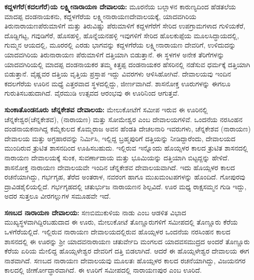 \textbf{ಕದ್ದಳಗೆರೆ(ಕದಲಗೆರೆ)ಯ ಲಕ್ಷ್ಮೀನಾರಾಯಣ ದೇವಾಲಯ:} ಮೂರನೆಯ ಬಲ್ಲಾಳನ ಕಾರುಣ್ಯದಿಂದ ಹೆಡತಲೆಯ ಮಾದಪ್ಪ ದಂಡನಾಯಕನು, ಕದ್ದಳಗೆರೆಯ ಲಕ್ಷ್ಮೀನಾರಾಯಣದೇವಾಲಯಕ್ಕೆ, ಯಾದವಗಿರಿಯ ತಿರುನಾರಾಯಣಪೆರುಮಾಳಿಗೆ ಮತ್ತು ತಿರುವಿಷ್ಣು ಪೆರುಮಾಳಿಗೆ ಕದ್ದಳಗೆರೆಗೆ ಸೇರಿದ ಉಪಗ್ರಾಮಗಳಾದ ಗುಳಿಯಕೆರೆ, ದೊಡ್ಡಿಗಟ್ಟ, ಗವುಡಿಗೆರೆ, ಹೊಸಹಳ್ಳಿ, ಹೊನ್ನೆಯನಹಳ್ಳಿ ಇವುಗಳಿಗೆ ಸೇರಿದ ಹೊಲಕುಪ್ಪೆಯ ಮೂಲಸಿದ್ಧಾಯದಲ್ಲಿ, ಗುಮ್ಮನ ಆಯದಲ್ಲಿ, ಮೂರರಲ್ಲಿ ಎರಡು ಭಾಗವನ್ನು ಕದ್ದಳಗೆರೆಯ ಲಕ್ಷ್ಮೀನಾರಾಯಣ ದೇವರಿಗೆ, ಉಳಿದುದನ್ನು ಯಾದವಗಿರಿಯ ತಿರುನಾರಾಯಣ ಪೆರುಮಾಳಿಗೆ ದತ್ತಿಯಾಗಿ ಬಿಡುತ್ತಾನೆ. ಈ ಸ್ಥಳಗಳ ಅನೇಕ ತೆರಿಗೆಗಳನ್ನು ಯಾದವಗಿರಿಯಲ್ಲಿ ಮಾದಪ್ಪ ದಂಡನಾಯಕರ ತಮ್ಮ ಕಿತ್ತಪ್ಪ ದಂಡನಾಯಕರ ಹೆಸರಿನಲ್ಲಿ ನಡೆಸುವ ಧರ್ಮಕ್ಕೆ ದತ್ತಿಯಾಗಿ ಬಿಡುತ್ತಾನೆ. ವೈಷ್ಣವರ ದತ್ತಿಯ ವೃತ್ತಿಯ ಪ್ರಸ್ತಾಪ ಇದ್ದು ವಿವರಗಳು ಆಳಿಸಿಹೋಗಿವೆ. ದೇವಾಲಯವು ಇಂದಿನ ಕದಲಗೆರೆಯ ಊರಿನ ಮಧ್ಯೆ ಎತ್ತರವಾದ ಸ್ಥಳದಲ್ಲಿದ್ದು, ಜೀರ್ಣವಾಗಿದೆ. ಶಾಸನೋಕ್ತ ಊರುಗಳನ್ನು ಈಗಲೂ ಗುರುತಿಸಬಹುದಾಗಿದೆ. ವೈರಮುಡಿ ಉತ್ಸವದ ಆರಂಭವು ಈ ಊರಿನಿಂದ ಆಗುತ್ತವೆ.

\textbf{ಸುಂಕಾತೊಂಡನೂರು ಚೆನ್ನಕೇಶವ ದೇವಾಲಯ:} ಮೇಲುಕೋಟೆಗೆ ಸಮೀಪ ಇರುವ ಈ ಊರಿನಲ್ಲಿ ಚೆನ್ನಕೇಶ್ವರ\break (ಚೆನ್ನಕೇಶವ), (ನಾರಾಯಣ) ಮತ್ತು ಸೋಮೇಶ್ವರ ಎಂಬ ದೇವಾಲಯಗಳಿವೆ. ಒಂದನೆಯ ನರಸಿಂಹನ ದಂಡನಾಯಕ\-ನಾಗಿದ್ದ ಕಮ್ಮೆಕುಲದ ಕೊಮ್ಮರಾಜ ಅವನ ಹೆಂಡತಿ ದೇಚಲನಾರಿ ಇವರುಗಳು, ಚೆನ್ನಕೇಶವ (ನಾರಾಯಣ) ದೇವಾಲಯ ಮತ್ತು ಅಗ್ರಹಾರವನ್ನು ನಿರ್ಮಿಸಿ, ಇಲ್ಲಿದ್ದ ಬ್ರಹ್ಮಪುರಿಗೆ ದತ್ತಿಯನ್ನು ನೀಡಿದ್ದಾರೆಂದು, ದೇವಾಲಯದ ಮುಂದಿರುವ ತ್ರುಟಿತ ಶಾಸನದಿಂದ ಊಹಿಸಬಹುದು. ಇಲ್ಲಿರುವ ಇನ್ನೊಂದು ಹೊಯ್ಸಳರ ಕಾಲದ ತ್ರುಟಿತ ಶಾಸನದಲ್ಲಿ ನಾರಾಯಣ ದೇವಾಲಯಕ್ಕೆ ಸುಂಕ, ಸುವರ್ಣಾದಾಯ ಮತ್ತು ಭೂಮಿಯನ್ನು ದತ್ತಿಯಾಗಿ ಬಿಟ್ಟದ್ದನ್ನು ಹೇಳಿದೆ. ಶಾಸನೋಕ್ತ ನಾರಾಯಣ ದೇವಾಲಯವೇ ಇಂದಿನ ಚೆನ್ನಕೇಶವ ದೇವಾಲಯವಾಗಿದೆ. ಇದು ಹೊಯ್ಸಳರ ಕಾಲದ ರಚನೆಯಾಗಿದ್ದು, ಗರ್ಭಗೃಹ, ತೆರೆದ ಅಂತರಾಳ, ನವರಂಗ ಹಾಗೂ ಮುಖಮಂಟಪಗಳನ್ನು ಹೊಂದಿದೆ. ಗೋಪುರವು ದ್ರಾವಿಡಶೈಲಿಯಲ್ಲಿದೆ. ಗರ್ಭಗೃಹದಲ್ಲಿ ಚತುರ್ಭುಜ ನಾರಾಯಣನ ಶಿಲ್ಪವಿದೆ. ಊರ ಮಧ್ಯ ರಾಕ್ಷಸಮ್ಮನ ಗುಡಿ ಇದ್ದು, ಅದರ ಸುತ್ತಲೂ ವೀರಗಲ್ಲುಗಳ ಸಮೂಹವೇ ಇದೆ.

\textbf{ಸಣಬದ ನಾರಾಯಣ ದೇವಾಲಯ:} ಸಣಬಿಮುಕುಳಿಯ ನಾಡು ಎಂಬ ಆಡಳಿತ ವಿಭಾದ ಮುಖ್ಯಸ್ಥಳವಾಗಿದ್ದಿರ\-ಬಹುದಾದ ಈ ಊರು, ಮೇಲುಕೋಟೆ ತೊಣ್ಣೂರುಗಳಿಗೆ ಸಮೀಪದಲ್ಲಿ ತೊಣ್ಣೂರು ಕೆರೆಯ ಒಳಗೆರೆಯಲ್ಲಿದೆ. ಇಲ್ಲಿರುವ ನಾರಾಯಣ ದೇವಾಲಯದಲ್ಲಿರುವ ಹೊಯ್ಸಳರ ಒಂದನೆಯ ನರಸಿಂಹನ ಕಾಲದ ಶಾಸನದಲ್ಲಿ ಈ ಊರನ್ನು ಶ‍್ರೀ ಯಾದವನಾರಾಯಣ ಚತುರ್ವೇದಿ ಮಂಗಲದ ಯಾದವಸಮುದ್ರದ ಅಂದರೆ ತೊಣ್ಣೂರು ಕೆರೆಯ ಏರಿಯ ಮೇಲಿದ್ದ ಹೊಯ್ಸಳೇಶ್ವರ ದೇವರಿಗೆ ದತ್ತಿ ಬಿಡಲಾಗಿದೆ. ಆದರೆ ಈ ಹೊಯ್ಸಳೇಶ್ವರ ದೇವಾಲಯ ಈಗ ನಾಶವಾಗಿದೆ. ಸಣಬದ ನಾರಾಯಣ ದೇವಾಲಯವು ಮೂಲತಃ ಹೊಯ್ಸಳರ ಕಾಲದ ರಚನೆಯಾಗಿದ್ದು, ವಿಜಯನಗರ ಕಾಲದಲ್ಲಿ ಜೀರ್ಣೋದ್ಧಾರ\-ವಾಗಿದೆ. ಈ ಊರಿಗೆ ಸಮೀಪದಲ್ಲಿ ನಾರಾಯಣಪುರ ಎಂಬ ಊರಿದೆ.

